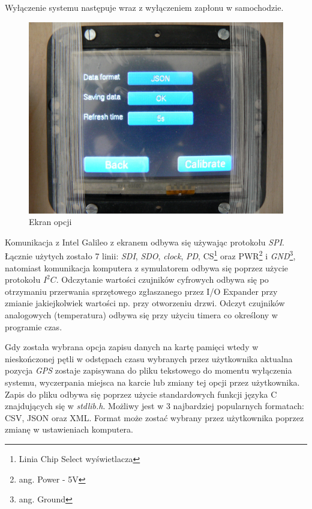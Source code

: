 \documentclass{xmgr}
\begin{document}
Wyłączenie systemu następuje wraz z wyłączeniem zapłonu w samochodzie. 

\begin{figure}[!h]
    \centering
    	\includegraphics[height=0.3\textheight]{images/opcje.JPG}
    \caption{Ekran opcji}
\end{figure}

Komunikacja z Intel Galileo z ekranem odbywa się używając protokołu \emph{SPI}. Łącznie użytych zostało 7 linii: \emph{SDI}, \emph{SDO}, \emph{clock}, \emph{PD}, CS\footnote{Linia Chip Select wyświetlacza} oraz PWR\footnote{ang. Power - 5V} i \emph{GND}\footnote{ang. Ground}, natomiast komunikacja komputera z symulatorem odbywa się poprzez użycie protokołu $I^2C$. Odczytanie wartości czujników cyfrowych odbywa się po otrzymaniu przerwania sprzętowego zgłaszanego przez I/O Expander przy zmianie jakiejkolwiek wartości np. przy otworzeniu drzwi. Odczyt czujników analogowych (temperatura) odbywa się przy użyciu timera co określony w programie czas. 

Gdy została wybrana opcja zapisu danych na kartę pamięci wtedy w nieskończonej pętli w odstępach czasu wybranych przez użytkownika aktualna pozycja \emph{GPS} zostaje zapisywana do pliku tekstowego do momentu wyłączenia systemu, wyczerpania miejsca na karcie lub zmiany tej opcji przez użytkownika. Zapis do pliku odbywa się poprzez użycie standardowych funkcji języka C znajdujących się w \emph{stdlib.h}. Możliwy jest w 3 najbardziej popularnych formatach: CSV, JSON oraz XML. Format może zostać wybrany przez użytkownika poprzez zmianę w ustawieniach komputera.
\end{document}
